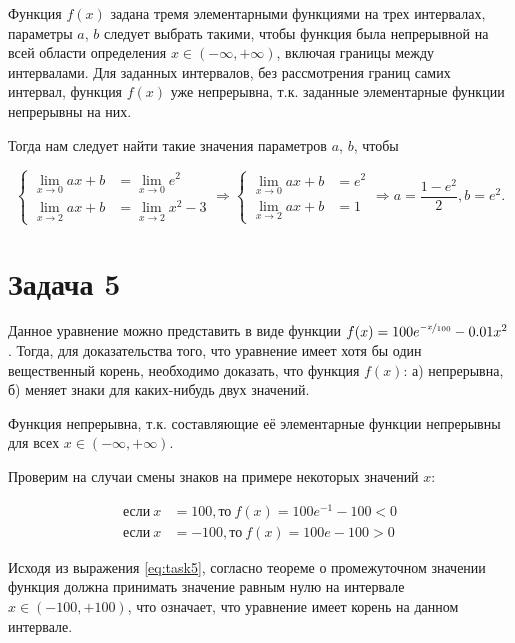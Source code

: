 \documentclass[a4paper,11pt]{article}
\begin{document}
Функция $f(x)$ задана тремя элементарными функциями на трех интервалах, параметры $a$, $b$ следует выбрать такими, чтобы функция была непрерывной на всей области определения $x \in (-\infty,+\infty)$, включая границы между интервалами. Для заданных интервалов, без рассмотрения границ самих интервал, функция $f(x)$ уже непрерывна, т.к. заданные элементарные функции непрерывны на них.

Тогда нам следует найти такие значения параметров $a$, $b$, чтобы

\begin{equation*}
  \begin{cases}
    \lim_{x \rightarrow 0} ax + b & = \lim_{x \rightarrow 0} e^2 \\
    \lim_{x \rightarrow 2} ax + b & = \lim_{x \rightarrow 2} x^2 - 3
  \end{cases}
  \Rightarrow
  \begin{cases}
    \lim_{x \rightarrow 0} ax + b & = e^2 \\
    \lim_{x \rightarrow 2} ax + b & = 1
  \end{cases}
  \Rightarrow
    a = \frac{1-e^2}{2}, b = e^2.
\end{equation*}

\section{Задача 5}

Данное уравнение можно представить в виде функции $f(x) = 100 e^{\nicefrac{-x}{100}} - 0.01x^2$. Тогда, для доказательства того, что уравнение имеет хотя бы один вещественный корень, необходимо доказать, что функция $f(x)$: а) непрерывна, б) меняет знаки для каких-нибудь двух значений.

Функция непрерывна, т.к. составляющие её элементарные функции непрерывны для всех $x \in (-\infty,+\infty)$.

Проверим на случаи смены знаков на примере некоторых значений $x$:

\begin{equation}
  \label{eq:task5}
  \begin{split}
  \text{если}\ x & = 100, \text{то}\  f(x) = 100e^{-1} - 100 < 0 \\
  \text{если}\ x & = -100, \text{то}\ f(x) = 100e - 100 > 0
  \end{split}
\end{equation}

Исходя из выражения \ref{eq:task5}, согласно теореме о промежуточном значении функция должна принимать значение равным нулю на интервале $x \in (-100,+100)$, что означает, что уравнение имеет корень на данном интервале.
\end{document}
